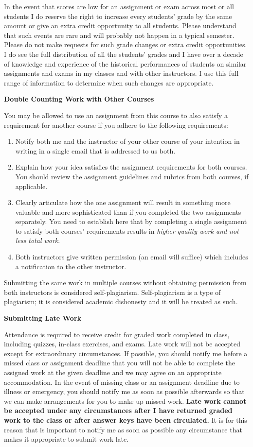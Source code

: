 \documentclass[10pt]{article}
\newcommand{\be}{\begin{enumerate}}
\newcommand{\ee}{\end{enumerate}}
\newcommand{\toprule}{\par\vspace*{5pt}\noindent{\hrule\hfill}\par\vspace*{1pt}}
\newcommand{\botrule}{\par\noindent{\hrule\hfill}\par}
\begin{document}
In the event that scores are low for an assignment or exam across most or all students I do reserve the right to increase every students' grade by the same amount or give an extra credit opportunity to all students.  Please understand that such events are rare and will probably not happen in a typical semester.  Please do not make requests for such grade changes or extra credit opportunities.  I do see the full distribution of all the students' grades and I have over a decade of knowledge and experience of the historical performances of students on similar assignments and exams in my classes and with other instructors.  I use this full range of information to determine when such changes are appropriate.\\

\botrule \textbf{Double Counting Work with Other Courses} \toprule
You may be allowed to use an assignment from this course to also satisfy a requirement for another course if you adhere to the following requirements:
\be
\item Notify both me and the instructor of your other course of your intention in writing in a single email that is addressed to us both.
\item Explain how your idea satisfies the assignment requirements for both courses. You should review the assignment guidelines and rubrics from both courses, if applicable.
\item Clearly articulate how the one assignment will result in something more valuable and more sophisticated than if you completed the two assignments separately.  You need to establish here that by completing a single assignment to satisfy both courses' requirements results in \textit{higher quality work and not less total work}.
\item Both instructors give written permission (an email will suffice) which includes a notification to the other instructor.
\ee

Submitting the same work in multiple courses without obtaining permission from both instructors is considered self-plagiarism.  Self-plagiarism is a type of plagiarism; it is considered academic dishonesty and it will be treated as such.\\

\botrule \textbf{Submitting Late Work} \toprule
Attendance is required to receive credit for graded work completed in class, including quizzes, in-class exercises, and exams.  Late work will not be accepted except for extraordinary circumstances.  If possible, you should notify me before a missed class or assignment deadline that you will not be able to complete the assigned work at the given deadline and we may agree on an appropriate accommodation.  In the event of missing class or an assignment deadline due to illness or emergency, you should notify me as soon as possible afterwards so that we can make arrangements for you to make up missed work.  \textbf{Late work cannot be accepted under any circumstances after I have returned graded work to the class or after answer keys have been circulated.}  It is for this reason that is important to notify me as soon as possible any circumstance that makes it appropriate to submit work late.\\
\end{document}
